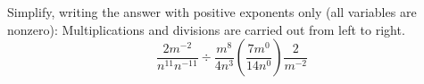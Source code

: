 Simplify, writing the answer with positive exponents only (all variables are nonzero): Multiplications and divisions are carried out from left to right.
\[
\dfrac{2m^{-2}}{n^{11}n^{-11}}\div\dfrac{m^8}{4n^3}\left(\dfrac{7m^0}{14n^0}\right)\dfrac{2}{m^{-2}}
\]
